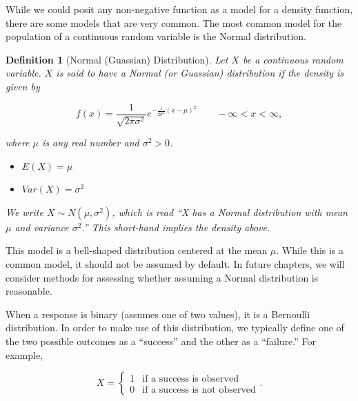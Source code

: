\documentclass[
]{book}
\providecommand{\tightlist}{%
  \setlength{\itemsep}{0pt}\setlength{\parskip}{0pt}}
\theoremstyle{plain}
\theoremstyle{mydefn}
\newtheorem{definition}{Definition}[chapter]
\theoremstyle{myexmpl}
\theoremstyle{remark}
\begin{document}
While we could posit any non-negative function as a model for a density function, there are some models that are very common. The most common model for the population of a continuous random variable is the Normal distribution.

\begin{definition}[Normal (Guassian) Distribution]
\protect\hypertarget{def:defn-normal-distribution}{}{\label{def:defn-normal-distribution} {} }Let \(X\) be a continuous random variable. \(X\) is said to have a Normal (or Guassian) distribution if the density is given by

\[f(x) = \frac{1}{\sqrt{2 \pi \sigma^2}} e^{-\frac{1}{2\sigma^2} (x - \mu)^2} \qquad -\infty < x < \infty,\]

where \(\mu\) is any real number and \(\sigma^2 > 0\).

\begin{itemize}
\tightlist
\item
  \(E(X) = \mu\)
\item
  \(Var(X) = \sigma^2\)
\end{itemize}

We write \(X \sim N\left(\mu, \sigma^2\right)\), which is read ``X has a Normal distribution with mean \(\mu\) and variance \(\sigma^2\).'' This short-hand implies the density above.
\end{definition}

This model is a bell-shaped distribution centered at the mean \(\mu\). While this is a common model, it should not be assumed by default. In future chapters, we will consider methods for assessing whether assuming a Normal distribution is reasonable.

When a response is binary (assumes one of two values), it is a Bernoulli distribution. In order to make use of this distribution, we typically define one of the two possible outcomes as a ``success'' and the other as a ``failure.'' For example,

\[X = \begin{cases} 1 & \text{if a success is observed} \\ 0 & \text{if a success is not observed} \end{cases}.\]
\end{document}
